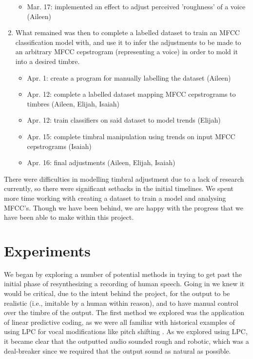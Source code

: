 \documentclass{article}
\begin{document}
\begin{enumerate}
\begin{itemize}
      \item Mar. 17: implemented an effect to adjust perceived 'roughness' of a voice (Aileen)
    \end{itemize}
  \item What remained was then to complete a labelled dataset to train an MFCC classification model with, and use it to infer the adjustments to be made to an arbitrary MFCC cepstrogram (representing a voice) in order to mold it into a desired timbre.
    \begin{itemize}
      \item Apr. 1: create a program for manually labelling the dataset (Aileen)
      \item Apr. 12: complete a labelled dataset mapping MFCC cepstrograms to timbres (Aileen, Elijah, Isaiah)
      \item Apr. 12: train classifiers on said dataset to model trends  (Elijah)
      \item Apr. 15: complete timbral manipulation using trends on input MFCC cepstrograms (Isaiah)
      \item Apr. 16: final adjustments (Aileen, Elijah, Isaiah)
    \end{itemize}
\end{enumerate}

There were difficulties in modelling timbral adjustment due to a lack of research currently, so there were significant setbacks in the initial timelines. We spent more time working with creating a dataset to train a model and analysing MFCC's. Though we have been behind, we are happy with the progress that we have been able to make within this project.

\section{Experiments}\label{sec:page_size}

We began by exploring a number of potential methods in trying to get past the initial phase of resynthesizing a recording of human speech. Going in we knew it would be critical, due to the intent behind the project, for the output to be realistic (i.e., imitable by a human within reason), and to have manual control over the timbre of the output. The first method we explored was the application of linear predictive coding, as we were all familiar with historical examples of using LPC for vocal modifications like pitch shifting \cite{SasahireAndHashimoto95}. As we explored using LPC, it became clear that the outputted audio sounded rough and robotic, which was a deal-breaker since we required that the output sound as natural as possible.
\end{document}
